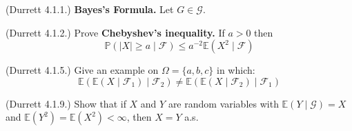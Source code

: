 \documentclass[12pt]{gradescopeexam}
\renewcommand\P{\mathbb{P}}
\newcommand\E{\mathbb{E}}
\renewcommand\c[1]{\mathcal{#1}}
\begin{document}
\makeheader
\vspace{0.1in}
\begin{questions}
  \begin{question}
    (Durrett 4.1.1.) \textbf{Bayes's Formula.} Let $G\in\c{G}$.
  \end{question}

  \begin{question}
    (Durrett 4.1.2.) Prove \textbf{Chebyshev's inequality.} If $a>0$ then
    \[ \P(|X|\ge a \mid \c{F}) \le a^{-2} \E(X^2 \mid \c{F}) \]
    \begin{prooforbox}[6.5in]
    \end{prooforbox}
  \end{question}

  \begin{question}
    (Durrett 4.1.5.) Give an example on $\Omega=\{a,b,c\}$ in which:
    \[ \E(\E(X \mid \c{F}_1) \mid\c{F}_2) \neq \E(\E(X \mid \c{F}_2)\mid \c{F}_1)  \]
    \begin{solutionorbox}[6.5in]
    \end{solutionorbox}
  \end{question}

  \begin{question}
    (Durrett 4.1.9.) Show that if $X$ and $Y$ are random variables with $\E(Y\mid \c{G})=X$ and
    $\E(Y^2)=\E(X^2)<\infty$, then $X=Y$ a.s.
    \begin{solutionorbox}[6.5in]
    \end{solutionorbox}
  \end{question}


\end{questions}
\end{document}
